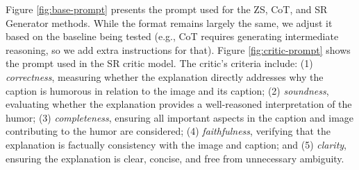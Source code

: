 Figure \ref{fig:base-prompt} presents the prompt used for the ZS, CoT, and SR Generator methods. While the format remains largely the same, we adjust it based on the baseline being tested (e.g., CoT requires generating intermediate reasoning, so we add extra instructions for that).
Figure \ref{fig:critic-prompt} shows the prompt used in the SR critic model. The critic's criteria include: (1) \textit{correctness}, measuring whether the explanation directly addresses why the caption is humorous in relation to the image and its caption; (2) \textit{soundness}, evaluating whether the explanation provides a well-reasoned interpretation of the humor; (3) \textit{completeness}, ensuring all important aspects in the caption and image contributing to the humor are considered; (4) \textit{faithfulness}, verifying that the explanation is factually consistency with the image and caption; and (5) \textit{clarity}, ensuring the explanation is clear, concise, and free from unnecessary ambiguity.
